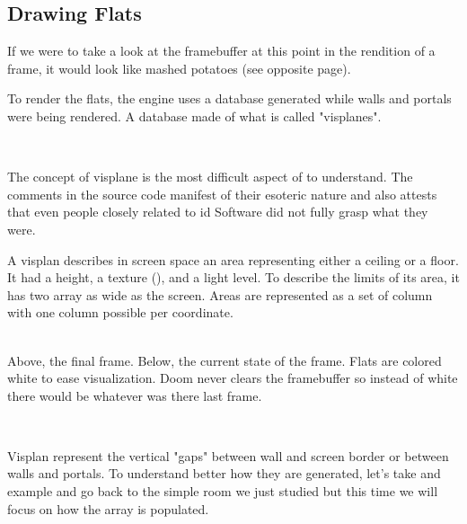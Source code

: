\subsection{Drawing Flats}
 If we were to take a look at the framebuffer at this point in the rendition of a frame, it would look like mashed potatoes (see opposite page).\\
\par
To render the flats, the engine uses a database generated while walls and portals were being rendered. A database made of what is called "visplanes".\\
\par
{}\\
\par
The concept of visplane is the most difficult aspect of \doom to understand. The comments in the source code manifest of their esoteric nature and also attests that even people closely related to id Software did not fully grasp what they were.\\
\par
A visplan describes in screen space an area representing either a ceiling or a floor. It had a height, a texture (), and a light level. To describe the limits of its area, it has two array as wide as the screen. Areas are represented as a set of column with one column possible per  coordinate.\\
\par


\\
\label{mashed_potatoes1.png}
Above, the final frame. Below, the current state of the frame. Flats are colored white to ease visualization. Doom never clears the framebuffer so instead of white there would be whatever was there last frame.\\
\par


\\
\par
Visplan represent the vertical "gaps" between wall and screen border or between walls and portals. 
To understand better how they are generated, let's take and example and go back to the simple room we just studied but this time we will focus on how the  array is populated.\\
\par

